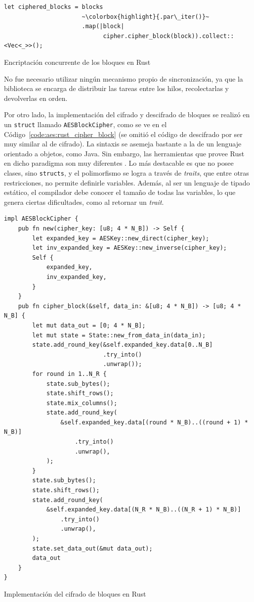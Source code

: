 \documentclass[11pt]{article}
\newcommand{\english}[1]{\textit{#1}}
\begin{document}
\begin{listing}[h]
\begin{verbatim}
let ciphered_blocks = blocks
                      ~\colorbox{highlight}{.par\_iter()}~
                      .map(|block|
                            cipher.cipher_block(block)).collect::<Vec<_>>();
\end{verbatim}
\caption{Encriptación concurrente de los bloques en Rust}
\label{code:rust:aes_concurrent}
\end{listing}

No fue necesario utilizar ningún mecanismo propio de sincronización, ya que la biblioteca se encarga de distribuir las tareas entre los hilos, recolectarlas y devolverlas en orden.

Por otro lado, la implementación del cifrado y descifrado de bloques se realizó en un \lstinline{struct} llamado \lstinline{AESBlockCipher}, como se ve en el Código~\ref{code:aes:rust_cipher_block} (se omitió el código de descifrado por ser muy similar al de cifrado). La sintaxis se asemeja bastante a la de un lenguaje orientado a objetos, como Java. Sin embargo, las herramientas que provee Rust en dicho paradigma son muy diferentes \cite{aes:rust_oop}. Lo más destacable es que no posee clases, sino \lstinline{structs}, y el polimorfismo se logra a través de \english{traits}, que entre otras restricciones, no permite definirle variables. Además, al ser un lenguaje de tipado estático, el compilador debe conocer el tamaño de todas las variables, lo que genera ciertas dificultades, como al retornar un \english{trait}.

\begin{listing}[h]
\begin{verbatim}
impl AESBlockCipher {
    pub fn new(cipher_key: [u8; 4 * N_B]) -> Self {
        let expanded_key = AESKey::new_direct(cipher_key);
        let inv_expanded_key = AESKey::new_inverse(cipher_key);
        Self {
            expanded_key,
            inv_expanded_key,
        }
    }
    pub fn cipher_block(&self, data_in: &[u8; 4 * N_B]) -> [u8; 4 * N_B] {
        let mut data_out = [0; 4 * N_B];
        let mut state = State::new_from_data_in(data_in);
        state.add_round_key(&self.expanded_key.data[0..N_B]
                            .try_into()
                            .unwrap());
        for round in 1..N_R {
            state.sub_bytes();
            state.shift_rows();
            state.mix_columns();
            state.add_round_key(
                &self.expanded_key.data[(round * N_B)..((round + 1) * N_B)]
                    .try_into()
                    .unwrap(),
            );
        }
        state.sub_bytes();
        state.shift_rows();
        state.add_round_key(
            &self.expanded_key.data[(N_R * N_B)..((N_R + 1) * N_B)]
                .try_into()
                .unwrap(),
        );
        state.set_data_out(&mut data_out);
        data_out
    }
}
\end{verbatim}
\caption{Implementación del cifrado de bloques en Rust}
\label{code:aes:rust_cipher_block}
\end{listing}
\end{document}
